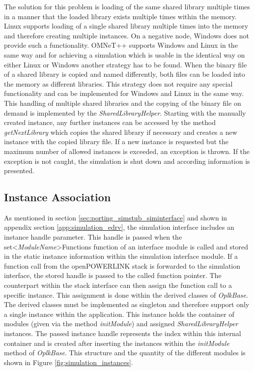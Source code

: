 The solution for this problem is loading of the same shared library multiple times in a manner that the loaded library exists multiple times within the memory.
Linux supports loading of a single shared library multiple times into the memory and therefore creating multiple instances.
On a negative node, Windows does not provide such a functionality.
OMNeT++ supports Windows and Linux in the same way and for achieving a simulation which is usable in the identical way on either Linux or Windows another strategy has to be found.
When the binary file of a shared library is copied and named differently, both files can be loaded into the memory as different libraries.
This strategy does not require any special functionality and can be implemented for Windows and Linux in the same way.
This handling of multiple shared libraries and the copying of the binary file on demand is implemented by the \emph{SharedLibraryHelper}.
Starting with the manually created instance, any further instances can be accessed by the method \emph{getNextLibrary} which copies the shared library if necessary and creates a new instance with the copied library file.
If a new instance is requested but the maximum number of allowed instances is exceeded, an exception is thrown.
If the exception is not caught, the simulation is shut down and according information is presented.


\subsection{Instance Association}
\label{sec:porting_stack_instance_assoc}
As mentioned in section \ref{sec:porting_simstub_siminterface} and shown in appendix section \ref{app:simulation_edrv}, the simulation interface includes an instance handle parameter.
This handle is passed when the set<\emph{ModuleName}>Functions function of an interface module is called and stored in the static instance information within the simulation interface module.
If a function call from the openPOWERLINK stack is forwarded to the simulation interface, the stored handle is passed to the called function pointer.
The counterpart within the stack interface can then assign the function call to a specific instance.
This assignment is done within the derived classes of \emph{OplkBase}.
The derived classes must be implemented as singleton and therefore support only a single instance within the application.
This instance holds the container of modules (given via the method \emph{initModule}) and assigned \emph{SharedLibraryHelper} instances.
The passed instance handle represents the index within this internal container and is created after inserting the instances within the \emph{initModule} method of \emph{OplkBase}.
This structure and the quantity of the different modules is shown in Figure \ref{fig:simulation_instances}.

